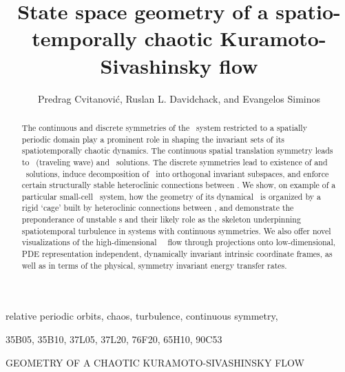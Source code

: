 \documentclass[final]{siamltex}
\begin{document}
                \title{
State space geometry of a spatio-temporally chaotic
Kuramoto-Sivashinsky flow
                 }
                  \author{
Predrag Cvitanovi\'c\footnotemark[1],
Ruslan L. Davidchack\footnotemark[2],
    and
Evangelos Siminos\footnotemark[1]
                    }

                \maketitle

\renewcommand{\thefootnote}{\fnsymbol{footnote}}
\renewcommand{\thefootnote}{\arabic{footnote}}

                \begin{abstract}
The continuous and discrete symmetries of the \KS\ system
restricted to a spatially periodic domain play a prominent
role in shaping the invariant sets of its
spatiotemporally chaotic dynamics.
The continuous spatial
translation symmetry leads to
\reqva\ (traveling wave) and \rpo\ solutions.
The discrete symmetries lead to existence of
{\eqv} and \po\ solutions,
induce decomposition
of \statesp\ into orthogonal invariant subspaces, and
enforce certain
structurally stable heteroclinic connections between \eqva.
We show, on example of a particular small-cell \KS\ system,
how the geometry of its dynamical \statesp\ is organized by a rigid
`cage' built by heteroclinic connections between \eqva,
and demonstrate the preponderance of unstable \rpo s and their likely
role as the skeleton underpinning spatiotemporal turbulence in systems
with continuous symmetries.
We also offer novel visualizations of the high-dimensional
\KS\ \statesp\ flow
through projections onto low-dimensional,
PDE representation independent,
dynamically invariant intrinsic coordinate frames,
as well as in terms of the physical, symmetry invariant
energy transfer rates.
                \end{abstract}

\begin{keywords}
relative periodic orbits, chaos, turbulence, continuous symmetry, {\KSe}
\end{keywords}

\begin{AMS}
35B05, 35B10, 37L05, 37L20, 76F20, 65H10, 90C53
\end{AMS}

\pagestyle{myheadings}
\thispagestyle{plain}
         {GEOMETRY OF A CHAOTIC KURAMOTO-SIVASHINSKY FLOW}








\appendix





\end{document}
